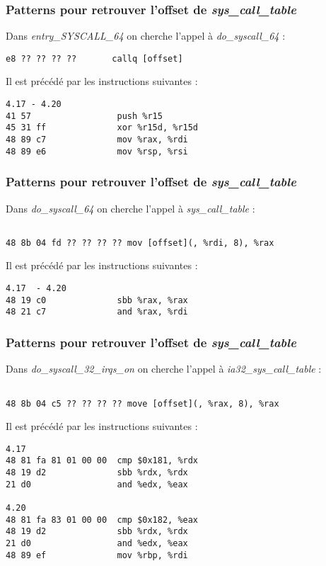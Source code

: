 \documentclass{beamer}
\begin{document}
\begin{frame}[fragile]
\frametitle{Patterns pour retrouver l'offset de \textit{sys\_call\_table}}
Dans \textit{entry\_SYSCALL\_64} on cherche l'appel à \textit{do\_syscall\_64} :
\begin{lstlisting}[style=CStyle]
e8 ?? ?? ?? ??       callq [offset]
\end{lstlisting}
\medskip
Il est précédé par les instructions suivantes :
\begin{lstlisting}[style=CStyle]
4.17 - 4.20
41 57                 push %r15  
45 31 ff              xor %r15d, %r15d  
48 89 c7              mov %rax, %rdi  
48 89 e6              mov %rsp, %rsi  
\end{lstlisting}
\end{frame}

\begin{frame}[fragile]
\frametitle{Patterns pour retrouver l'offset de \textit{sys\_call\_table}}
Dans \textit{do\_syscall\_64} on cherche l'appel à \textit{sys\_call\_table} :
\begin{lstlisting}[style=CStyle]

48 8b 04 fd ?? ?? ?? ?? mov [offset](, %rdi, 8), %rax
\end{lstlisting}
\medskip
Il est précédé par les instructions suivantes :
\begin{lstlisting}[style=CStyle]
4.17  - 4.20
48 19 c0              sbb %rax, %rax  
48 21 c7              and %rax, %rdi  
\end{lstlisting}
\end{frame}

\begin{frame}[fragile]
\frametitle{Patterns pour retrouver l'offset de \textit{sys\_call\_table}}
Dans \textit{do\_syscall\_32\_irqs\_on} on cherche l'appel à \textit{ia32\_sys\_call\_table} :
\begin{lstlisting}[style=CStyle]

48 8b 04 c5 ?? ?? ?? ?? move [offset](, %rax, 8), %rax
\end{lstlisting}
\medskip
Il est précédé par les instructions suivantes :
\begin{lstlisting}[style=CStyle]
4.17  
48 81 fa 81 01 00 00  cmp $0x181, %rdx  
48 19 d2              sbb %rdx, %rdx  
21 d0                 and %edx, %eax  

4.20  
48 81 fa 83 01 00 00  cmp $0x182, %eax  
48 19 d2              sbb %rdx, %rdx  
21 d0                 and %edx, %eax  
48 89 ef              mov %rbp, %rdi  
\end{lstlisting}
\end{frame}
\end{document}
